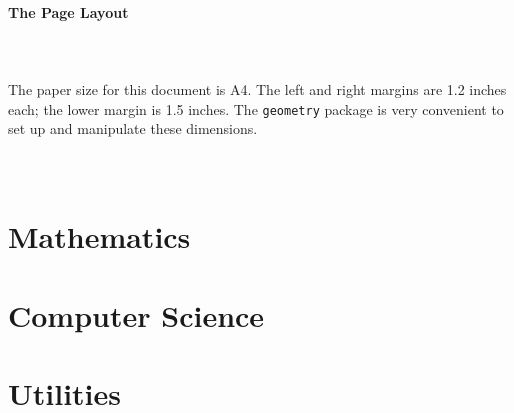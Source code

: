 \documentclass[a4paper]{article}
\begin{document}
\paragraph{The Page Layout}\mbox{}\\\mbox{}\\
The paper size for this document is A4. The left and right margins are 1.2 inches each; the lower margin is 1.5 inches. The \texttt{geometry} package is very convenient to set up and manipulate these dimensions.\mbox{}\\\mbox{}\\\mbox{}\\
\section{Mathematics}
\section{Computer Science}
\section{Utilities}
\end{document}

